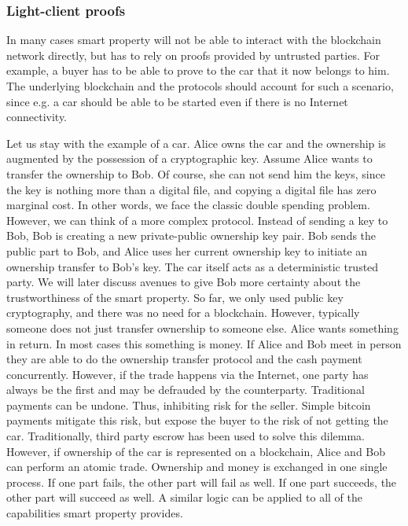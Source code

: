 \subsubsection{Light-client proofs}

In many cases smart property will not be able to interact with the blockchain network directly, but has to rely on proofs provided by untrusted parties. For example, a buyer has to be able to prove to the car that it now belongs to him. The underlying blockchain and the protocols should account for such a scenario, since e.g. a car should be able to be started even if there is no Internet connectivity.




Let us stay with the example of a car. Alice owns the car and the ownership is augmented by the possession of a cryptographic key. Assume Alice wants to transfer the ownership to Bob. Of course, she can not send him the keys, since the key is nothing more than a digital file, and copying a digital file has zero marginal cost. In other words, we face the classic double spending problem. However, we can think of a more complex protocol. Instead of sending a key to Bob, Bob is creating a new private-public ownership key pair. Bob sends the public part to Bob, and Alice uses her current ownership key to initiate an ownership transfer to Bob's key. The car itself acts as a deterministic trusted party. We will later discuss avenues to give Bob more certainty about the trustworthiness of the smart property.
So far, we only used public key cryptography, and there was no need for a blockchain. However, typically someone does not just transfer ownership to someone else. Alice wants something in return. In most cases this something is money. If Alice and Bob meet in person they are able to do the ownership transfer protocol and the cash payment concurrently. However, if the trade happens via the Internet, one party has always be the first and may be defrauded by the counterparty. Traditional payments can be undone. Thus, inhibiting risk for the seller. Simple bitcoin payments mitigate this risk, but expose the buyer to the risk of not getting the car. Traditionally, third party escrow has been used to solve this dilemma.
However, if ownership of the car is represented on a blockchain, Alice and Bob can perform an atomic trade. Ownership and money is exchanged in one single process. If one part fails, the other part will fail as well. If one part succeeds, the other part will succeed as well. A similar logic can be applied to all of the capabilities smart property provides.

